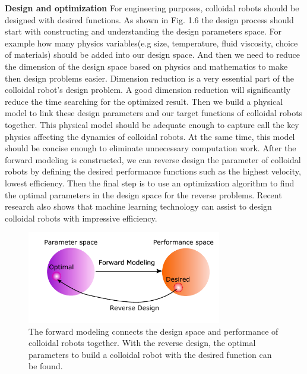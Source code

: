 \textbf{Design and optimization} For engineering purposes, colloidal robots should be designed with desired functions\autocite{liebchen2019optimal}. As shown in Fig. 1.6 the design process should start with constructing and understanding the design parameters space. For example how many physics variables(e.g size, temperature, fluid viscosity, choice of materials) should be added into our design space. And then we  need to reduce the dimension of the design space based on physics and mathematics to make then design problems easier. Dimension reduction is a very essential part of the colloidal robot's design problem. A good dimension reduction will significantly reduce the time searching for the optimized result. Then we build a physical model to link these design parameters and our target functions of colloidal robots together. This physical model should be adequate enough  to capture call the key physics affecting the dynamics of colloidal robots. At the same time, this model should be concise enough to eliminate unnecessary computation work. After the forward modeling is constructed, we can reverse design the parameter of colloidal robots by defining the desired performance functions such as the highest velocity, lowest efficiency. Then the final step is to use an optimization algorithm to find the optimal parameters in the design space for the reverse problems. \autocite{ward1963hierarchical,nocedal2006numerical} Recent research also shows that machine learning technology can assist to design colloidal robots with impressive efficiency\autocite{yang2020micro,yang2020cargo,yang2019deep,tsang2018self}.
\begin{figure}
\centering
\includegraphics[width=8.5cm]{figures/1_6.pdf}
\caption{The forward modeling connects the design space and performance of colloidal robots together. With the reverse design, the optimal parameters to build a colloidal robot with the desired function can be found.}
\label{fig:1.6}
\end{figure}


